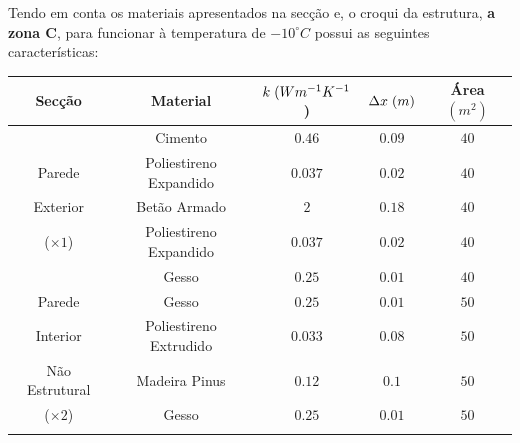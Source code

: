 \documentclass[12pt, a4paper]{article}
\begin{document}
Tendo em conta os materiais apresentados na secção e, o croqui da estrutura, \textbf{a zona C}, para funcionar
à temperatura de $ -10^\circ C $ possui as seguintes características:

\begin{table}[htpb]
	\begin{center}
		\begin{tabular}{c c c c c}
			\toprule{}
			Secção                     & Material               & $ k \hspace{1mm} (Wm^{-1}K^{-1}$) & $ \Delta x \hspace{1mm} (m)$ & Área $(m^2) $ \\
				\midrule{}

			\multirow{5}{*}{}          & Cimento                & $0.46$                            & $0.09$                       & $40$          \\
				\cline{2-5}
			Parede                     & Poliestireno Expandido & $0.037$                           & $0.02$                       & $40$          \\
				\cline{2-5}
			Exterior                   & Betão Armado           & $2$                               & $0.18$                       & $40$          \\
				\cline{2-5}
			($\times 1$)               & Poliestireno Expandido & $0.037$                           & $0.02$                       & $40$          \\
				\cline{2-5}
			                           & Gesso                  & $0.25$                            & $0.01$                       & $40$          \\
				\midrule{}

			Parede \multirow{4}{*}{}   & Gesso                  & $0.25$                            & $0.01$                       & $50$          \\
				\cline{2-5}
			Interior                   & Poliestireno Extrudido & $0.033$                           & $0.08$                       & $50$          \\
				\cline{2-5}
			Não Estrutural             & Madeira Pinus          & $0.12$                            & $0.1$                        & $50$          \\
				\cline{2-5}
			($\times2$)                & Gesso                  & $0.25$                            & $0.01$                       & $50$          \\
				\midrule{}


\end{tabular}
\end{center}
\end{table}
\end{document}
